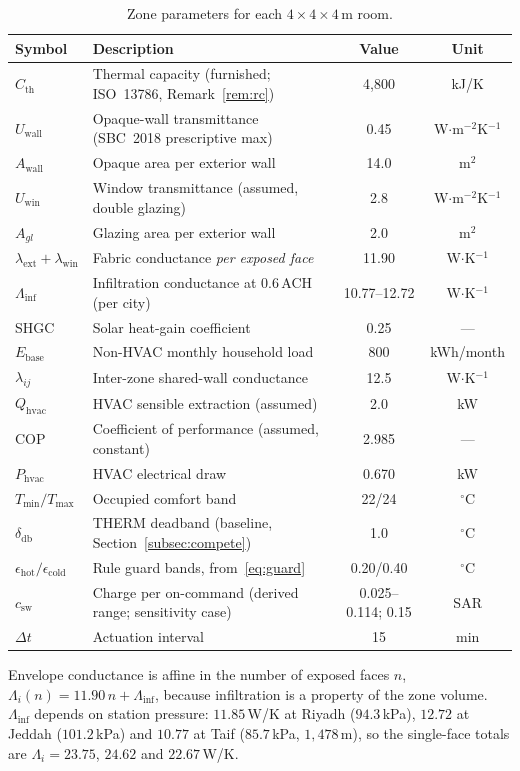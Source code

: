 \documentclass[pdflatex,sn-mathphys-num,iicol]{sn-jnl}
\theoremstyle{thmstyleone}\newtheorem{proposition}{Proposition}\newtheorem{corollary}{Corollary}
\theoremstyle{thmstyletwo}\newtheorem{remark}{Remark}\newtheorem{observation}{Observation}
\theoremstyle{thmstylethree}\newtheorem{definition}{Definition}
\newcommand{\Tmin}{T_{\min}}
\newcommand{\Tmax}{T_{\max}}
\newcommand{\deadband}{\delta_{\mathrm{db}}}
\newcommand{\Cth}{C_{\mathrm{th}}}
\newcommand{\lext}{\lambda_{\mathrm{ext}}}
\newcommand{\lwin}{\lambda_{\mathrm{win}}}
\newcommand{\lij}{\lambda_{ij}}
\newcommand{\Qhvac}{Q_{\mathrm{hvac}}}
\newcommand{\csw}{c_{\mathrm{sw}}}
\newcommand{\Phvac}{P_{\mathrm{hvac}}}
\begin{document}
\begin{table}[t]
\centering
\caption{Zone parameters for each $4\times4\times4\,\text{m}$ room.}
\label{tab:params}
\setlength{\tabcolsep}{4.5pt}
\begin{tabularx}{\linewidth}{lXcc}
\toprule
Symbol & Description & Value & Unit \\
\midrule
$\Cth$   & Thermal capacity (furnished; ISO~13786, Remark~\ref{rem:rc}) & 4{,}800 & kJ/K\\
$U_{\mathrm{wall}}$ & Opaque-wall transmittance (SBC~2018 prescriptive max) & 0.45 & W$\cdot$m$^{-2}$K$^{-1}$ \\
$A_{\mathrm{wall}}$ & Opaque area per exterior wall & 14.0 & m$^2$ \\
$U_{\mathrm{win}}$ & Window transmittance (assumed, double glazing) & 2.8 & W$\cdot$m$^{-2}$K$^{-1}$ \\
$A_{gl}$ & Glazing area per exterior wall            & 2.0 & m$^2$ \\
$\lext+\lwin$ & Fabric conductance \emph{per exposed face} & 11.90 & W$\cdot$K$^{-1}$ \\
$\Lambda_{\mathrm{inf}}$ & Infiltration conductance at $0.6\,$ACH (per city) & 10.77--12.72 & W$\cdot$K$^{-1}$ \\
SHGC     & Solar heat-gain coefficient               & 0.25 & --- \\
$E_{\mathrm{base}}$ & Non-HVAC monthly household load  & 800 & kWh/month \\
$\lij$   & Inter-zone shared-wall conductance         & 12.5 & W$\cdot$K$^{-1}$ \\
$\Qhvac$ & HVAC sensible extraction (assumed)        &  2.0 & kW \\
COP      & Coefficient of performance (assumed, constant) & 2.985 & --- \\
$\Phvac$ & HVAC electrical draw                       & 0.670 & kW \\
$\Tmin/\Tmax$ & Occupied comfort band                & 22/24 & $^\circ$C \\
$\deadband$ & THERM deadband (baseline, Section~\ref{subsec:compete}) & 1.0 & $^\circ$C \\
$\epsilon_{\mathrm{hot}}/\epsilon_{\mathrm{cold}}$ & Rule guard bands, from~\eqref{eq:guard} & 0.20/0.40 & $^\circ$C \\
$\csw$       & Charge per on-command (derived range; sensitivity case) & 0.025--0.114; 0.15 & SAR \\
$\Delta t$  & Actuation interval                      &   15 & min \\
\bottomrule
\end{tabularx}
\vspace{2pt}
{\footnotesize\raggedright
Envelope conductance is affine in the number of exposed faces $n$,
$\Lambda_i(n)=11.90\,n+\Lambda_{\mathrm{inf}}$, because infiltration is a
property of the zone volume. $\Lambda_{\mathrm{inf}}$ depends on station
pressure: $11.85\,$W/K at Riyadh ($94.3\,$kPa), $12.72$ at Jeddah
($101.2\,$kPa) and $10.77$ at Taif ($85.7\,$kPa, $1{,}478\,$m), so the
single-face totals are $\Lambda_i=23.75$, $24.62$ and $22.67\,$W/K.\par}
\end{table}
\end{document}
